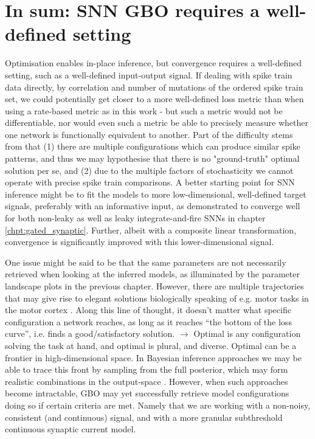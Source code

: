 \documentclass[mphil,deptreport,ianc]{infthesis} %
\begin{document}



\chapter{In sum: SNN GBO requires a well-defined setting}

Optimisation enables in-place inference, but convergence requires a well-defined setting, such as a well-defined input-output signal.
If dealing with spike train data directly, by correlation and number of mutations of the ordered spike train set, we could potentially get closer to a more well-defined loss metric than when using a rate-based metric as in this work - but such a metric would not be differentiable, nor would even such a metric be able to precisely measure whether one network is functionally equivalent to another.
Part of the difficulty stems from that (1) there are multiple configurations which can produce similar spike patterns, and thus we may hypothesise that there is no "ground-truth" optimal solution per se, and (2) due to the multiple factors of stochasticity we cannot operate with precise spike train comparisons. 
A better starting point for SNN inference might be to fit the models to more low-dimensional, well-defined target signals, preferably with an informative input, as demonstrated to converge well for both non-leaky as well as leaky integrate-and-fire SNNs in chapter \ref{chpt:gated_synaptic}.
Further, albeit with a composite linear transformation, convergence is significantly improved with this lower-dimensional signal.

One issue might be said to be that the same parameters are not necessarily retrieved when looking at the inferred models, as illuminated by the parameter landscape plots in the previous chapter.
However, there are multiple trajectories that may give rise to elegant solutions biologically speaking of e.g. motor tasks in the motor cortex \cite{Marblestone2016}.
Along this line of thought, it doesn’t matter what specific configuration a network reaches, as long as it reaches “the bottom of the loss curve”, i.e. finds a good/satisfactory solution.
$\rightarrow$ Optimal is any configuration solving the task at hand, and optimal is plural, and diverse. Optimal can be a frontier in high-dimensional space.
In Bayesian inference approaches we may be able to trace this front by sampling from the full posterior, which may form realistic combinations in the output-space \cite{Lueckmann2017}.
However, when such approaches become intractable, GBO may yet successfully retrieve model configurations doing so if certain criteria are met.
Namely that we are working with a non-noisy, consistent (and continuous) signal, and with a more granular subthreshold continuous synaptic current model.
\end{document}
